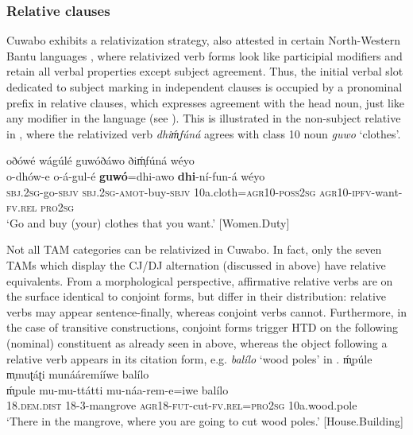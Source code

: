 \documentclass[output=paper,colorlinks=true, citecolor=brown,draftmode]{langscibook}
\begin{document}
\subsubsection{Relative clauses}\label{sec:cuw:2.4.3}
Cuwabo exhibits a relativization strategy, also attested in certain North-Western Bantu languages \citep{Nsuka-Nkutsi1982}, where relativized verb forms look like participial modifiers and retain all verbal properties except subject agreement. Thus, the initial verbal slot dedicated to subject marking in independent clauses is occupied by a pronominal prefix in relative clauses, which expresses agreement with the head noun, just like any modifier in the language (see \citealt{GuéroisCreissels2020}). This is illustrated in the non-subject relative in , where the relativized verb \textit{dhiḿ̩fúná} agrees with class 10 noun \textit{guwo} ‘clothes’.

{\ea\label{ex:cuw:48} oðówé wágúlé guwóðáwo ðiḿ̩fúná wéyo\\
    \gll  o-dhów-e o-á-gul-é \textbf{guwó}=dhi-awo \textbf{dhi}{}-ní-fun-á wéyo  \\
          \textsc{sbj.2sg}{}-go-\textsc{sbjv} \textsc{sbj.2sg-amot-}buy-\textsc{sbjv} 10a.cloth=\textsc{agr}10-\textsc{poss2sg} \textsc{agr10-ipfv-}want-\textsc{fv.rel} \textsc{pro2sg}  \\
    \glt  ‘Go and buy (your) clothes that you want.’ [Women.Duty]
\z }

Not all TAM categories can be relativized in Cuwabo. In fact, only the seven TAMs which display the CJ/DJ alternation (discussed in  above) have relative equivalents. From a morphological perspective, affirmative relative verbs are on the surface identical to conjoint forms, but differ in their distribution: relative verbs may appear sentence-finally, whereas conjoint verbs cannot. Furthermore, in the case of transitive constructions, conjoint forms trigger HTD on the following (nominal) constituent as already seen in  above, whereas the object following a relative verb appears in its citation form, e.g. \textit{balílo} ‘wood poles’ in .
\newpage
\ea\label{ex:cuw:49} ḿ̩púle m̩muʈáʈi munááremííwe balílo\\
    \gll  ḿ̩pule mu-mu-ttátti mu-náa-rem-e=iwe balílo  \\
           18.\textsc{dem.dist} \textsc{18-3-}mangrove \textsc{agr18-fut}{}-cut-\textsc{fv.rel=pro2sg} 10a.wood.pole \\ 
    \glt ‘There in the mangrove, where you are going to cut wood poles.’ [House.Building]
\z 
\end{document}
